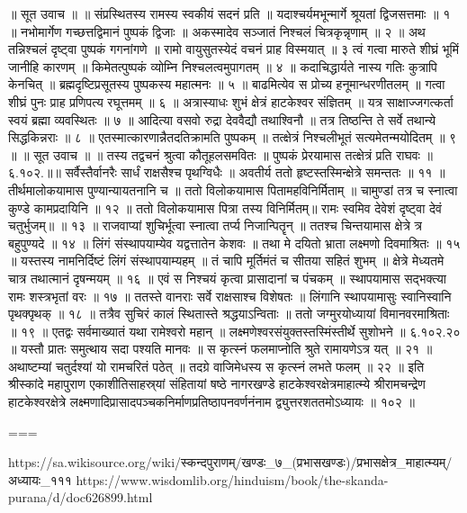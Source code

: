 ॥ सूत उवाच ॥ ॥
संप्रस्थितस्य रामस्य स्वकीयं सदनं प्रति ॥
यदाश्चर्यमभून्मार्गे श्रूयतां द्विजसत्तमाः ॥ १ ॥
नभोमार्गेण गच्छत्तद्विमानं पुष्पकं द्विजाः ॥
अकस्मादेव सञ्जातं निश्चलं चित्रकृन्नृणाम् ॥ २ ॥
अथ तन्निश्चलं दृष्ट्वा पुष्पकं गगनांगणे ॥
रामो वायुसुतस्येदं वचनं प्राह विस्मयात् ॥ ३
त्वं गत्वा मारुते शीघ्रं भूमिं जानीहि कारणम् ॥
किमेतत्पुष्पकं व्योम्नि निश्चलत्वमुपागतम् ॥ ४ ॥
कदाचिद्धार्यते नास्य गतिः कुत्रापि केनचित् ॥
ब्रह्मदृष्टिप्रसूतस्य पुष्पकस्य महात्मनः ॥ ५ ॥
बाढमित्येव स प्रोच्य हनूमान्धरणीतलम् ॥
गत्वा शीघ्रं पुनः प्राह प्रणिपत्य रघूत्तमम् ॥ ६ ॥
अत्रास्याधः शुभं क्षेत्रं हाटकेश्वर संज्ञितम् ॥
यत्र साक्षाज्जगत्कर्ता स्वयं ब्रह्मा व्यवस्थितः ॥ ७ ॥
आदित्या वसवो रुद्रा देववैद्यौ तथाश्विनौ ॥
तत्र तिष्ठन्ति ते सर्वे तथान्ये सिद्धकिन्नराः ॥ ८ ॥
एतस्मात्कारणान्नैतदतिक्रामति पुष्पकम् ॥
तत्क्षेत्रं निश्चलीभूतं सत्यमेतन्मयोदितम् ॥ ९ ॥
॥ सूत उवाच ॥ ॥
तस्य तद्वचनं श्रुत्वा कौतूहलसमवितः ॥
पुष्पकं प्रेरयामास तत्क्षेत्रं प्रति राघवः ॥६.१०२.॥॥
सर्वैस्तैर्वानरैः सार्धं राक्षसैश्च पृथग्विधैः ॥
अवतीर्य ततो हृष्टस्तस्मिन्क्षेत्रे समन्ततः ॥ ११ ॥
तीर्थमालोकयामास पुण्यान्यायतनानि च ॥
ततो विलोकयामास पितामहविनिर्मिताम् ॥
चामुण्डां तत्र च स्नात्वा कुण्डे कामप्रदायिनि ॥ १२ ॥
ततो विलोकयामास पित्रा तस्य विनिर्मितम्॥
रामः स्वमिव देवेशं दृष्ट्वा देवं चतुर्भुजम्॥ ॥ १३ ॥
राजवाप्यां शुचिर्भूत्वा स्नात्वा तर्प्य निजान्पितॄन् ॥
ततश्च चिन्तयामास क्षेत्रे त्र बहुपुण्यदे ॥ १४ ॥
लिंगं संस्थापयाम्येव यद्वत्तातेन केशवः ॥
तथा मे दयितो भ्राता लक्ष्मणो दिवमाश्रितः ॥ १५ ॥
यस्तस्य नामनिर्दिष्टं लिंगं संस्थापयाम्यहम् ॥
तं चापि मूर्तिमंतं च सीतया सहितं शुभम् ॥
क्षेत्रे मेध्यतमे चात्र तथात्मानं दृषन्मयम् ॥ १६ ॥
एवं स निश्चयं कृत्वा प्रासादानां च पंचकम् ॥
स्थापयामास सद्भक्त्या रामः शस्त्रभृतां वरः ॥ १७ ॥
ततस्ते वानराः सर्वे राक्षसाश्च विशेषतः ॥
लिंगानि स्थापयामासुः स्वानिस्वानि पृथक्पृथक् ॥ १८ ॥
तत्रैव सुचिरं कालं स्थितास्ते श्रद्धयाऽन्विताः ॥
ततो जग्मुरयोध्यायां विमानवरमाश्रिताः ॥ १९ ॥
एतद्वः सर्वमाख्यातं यथा रामेश्वरो महान् ॥
लक्ष्मणेश्वरसंयुक्तस्तस्मिंस्तीर्थे सुशोभने ॥ ६.१०२.२० ॥
यस्तौ प्रातः समुत्थाय सदा पश्यति मानवः ॥
स कृत्स्नं फलमाप्नोति श्रुते रामायणेऽत्र यत् ॥ २१ ॥
अथाष्टम्यां चतुर्दश्यां यो रामचरितं पठेत् ॥
तदग्रे वाजिमेधस्य स कृत्स्नं लभते फलम् ॥ २२ ॥
इति श्रीस्कांदे महापुराण एकाशीतिसाहस्र्यां संहितायां षष्ठे नागरखण्डे हाटकेश्वरक्षेत्रमाहात्म्ये श्रीरामचन्द्रेण हाटकेश्वरक्षेत्रे लक्ष्मणादिप्रासादपञ्चकनिर्माणप्रतिष्ठापनवर्णनंनाम द्व्युत्तरशततमोऽध्यायः ॥ १०२ ॥

===

https://sa.wikisource.org/wiki/स्कन्दपुराणम्/खण्डः_७_(प्रभासखण्डः)/प्रभासक्षेत्र_माहात्म्यम्/अध्यायः_१११
https://www.wisdomlib.org/hinduism/book/the-skanda-purana/d/doc626899.html

